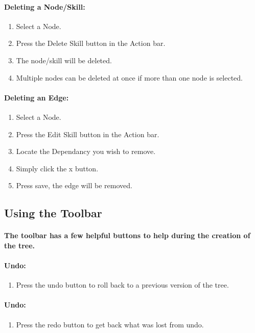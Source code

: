\documentclass[12pt]{article}
\begin{document}
\paragraph{Deleting a Node/Skill:}
\begin{enumerate}
	\item Select a Node.
	\item Press the Delete Skill button in the Action bar.
	\item The node/skill will be deleted.
	\item Multiple nodes can be deleted at once if more than one node is selected.
\end{enumerate}

\paragraph{Deleting an Edge:}
\begin{enumerate}
	\item Select a Node.
	\item Press the Edit Skill button in the Action bar.
	\item Locate the Dependancy you wish to remove.
	\item Simply click the x button.
	\item Press save, the edge will be removed.
\end{enumerate}

\subsection{Using the Toolbar}
\paragraph{The toolbar has a few helpful buttons to help during the creation of the tree.}

\paragraph{Undo:}
\begin{enumerate}
	\item Press the undo button to roll back to a previous version of the tree.
\end{enumerate}

\paragraph{Undo:}
\begin{enumerate}
	\item Press the redo button to get back what was lost from undo.
\end{enumerate}
\end{document}

